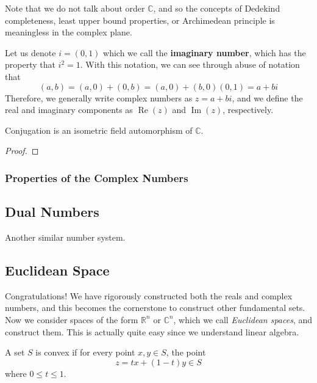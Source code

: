 \documentclass{article}
\DeclareMathOperator{\im}{Im}
\DeclareMathOperator{\re}{Re}
\begin{document}
    Note that we do not talk about order $\mathbb{C}$, and so the concepts of Dedekind completeness, least upper bound properties, or Archimedean principle is meaningless in the complex plane. 

    \begin{definition} 
      Let us denote $i = (0, 1)$ which we call the \textbf{imaginary number}, which has the property that $i^2 = 1$. With this notation, we can see through abuse of notation that 
      \begin{equation}
        (a, b) = (a, 0) + (0, b) = (a, 0) + (b, 0) (0, 1) = a + bi
      \end{equation} 
      Therefore, we generally write complex numbers as $z = a + bi$, and we define the real and imaginary components as $\re(z)$ and $\im(z)$, respectively. 
    \end{definition}

    \begin{theorem}
      Conjugation is an isometric field automorphism of $\mathbb{C}$. 
    \end{theorem}
    \begin{proof}
      
    \end{proof}

    \subsubsection{Properties of the Complex Numbers} 

  \subsection{Dual Numbers}

    Another similar number system. 

  \subsection{Euclidean Space} 

    Congratulations! We have rigorously constructed both the reals and complex numbers, and this becomes the cornerstone to construct other fundamental sets. Now we consider spaces of the form $\mathbb{R}^n$ or $\mathbb{C}^n$, which we call \textit{Euclidean spaces}, and construct them. This is actually quite easy since we understand linear algebra. 

    \begin{definition}
      A set $S$ is convex if for every point $x, y \in S$, the point 
      \begin{equation}
        z = t x + (1 - t) y \in S
      \end{equation}
      where $0 \leq t \leq 1$. 
    \end{definition}
  
\end{document}
